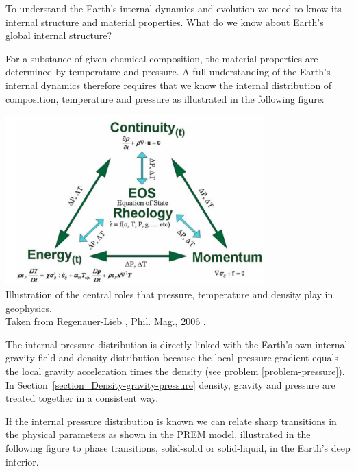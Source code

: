 To understand the Earth's internal dynamics and evolution we need
to know its internal structure and material properties.
What do we know about Earth's global internal structure?

For a substance of given chemical composition, the material properties
are determined by temperature and pressure.
A full understanding of the Earth's internal dynamics therefore
requires that we know the internal distribution of composition, 
temperature and pressure as illustrated in the following figure:

\begin{center}
\includegraphics[width=10cm]{images/gravity/reg}\\
{\captionfont
Illustration of the central roles that pressure, temperature and density play in geophysics.\\ 
Taken from Regenauer-Lieb \etal, Phil. Mag., 2006 \cite{rehy06}.
}
\end{center}
 
The internal pressure distribution is directly linked with the Earth's 
own internal gravity field and density distribution because
the local pressure gradient equals the local gravity acceleration
times the density (see problem \ref{problem-pressure}).
In Section~\ref{section_Density-gravity-pressure} density, gravity
and pressure are treated together in a consistent way. 

If the internal pressure distribution is known we can relate sharp
transitions in the physical parameters as shown in the PREM model,
illustrated in the following figure 
to phase transitions, solid-solid or solid-liquid, 
in the Earth's deep interior.

